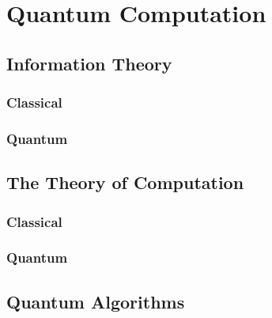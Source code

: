 
\chapter{Quantum Computation}
\label{chap:quantumComputation}
%

\section{Information Theory}

\subsection{Classical}

\subsection{Quantum}

\section{The Theory of Computation}

\subsection{Classical}

\subsection{Quantum}


\section{Quantum Algorithms}


